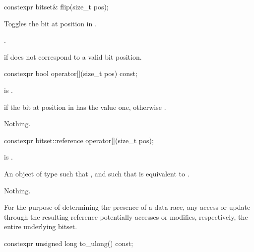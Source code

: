 %
\begin{itemdecl}
constexpr bitset& flip(size_t pos);
\end{itemdecl}

\begin{itemdescr}
\pnum
\effects
Toggles the bit at position  in
.

\pnum
\returns
{}.

\pnum
\throws
{}%
 if  does not correspond to a valid bit position.
\end{itemdescr}

%
\begin{itemdecl}
constexpr bool operator[](size_t pos) const;
\end{itemdecl}

\begin{itemdescr}
\pnum
\hardexpects
{} is .

\pnum
\returns
{} if the bit at position  in  has the value
one, otherwise .

\pnum
\throws
Nothing.
\end{itemdescr}

%
\begin{itemdecl}
constexpr bitset::reference operator[](size_t pos);
\end{itemdecl}

\begin{itemdescr}
\pnum
\hardexpects
{} is .

\pnum
\returns
An object of type
such that
,
and such that
is equivalent to
.

\pnum
\throws
Nothing.

\pnum
\remarks
For the purpose of determining the presence of a data
race, any access or update through the resulting
reference potentially accesses or modifies, respectively, the entire
underlying bitset.
\end{itemdescr}

%
\begin{itemdecl}
constexpr unsigned long to_ulong() const;
\end{itemdecl}

